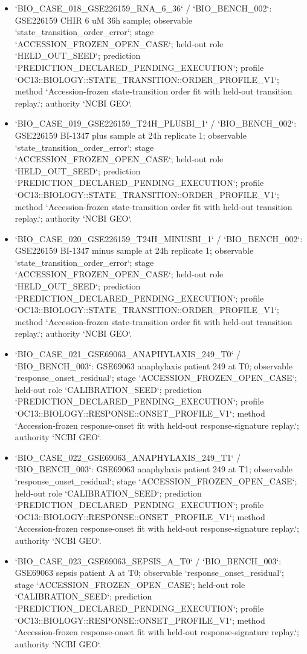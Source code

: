 \begin{itemize}
\item `BIO\_CASE\_018\_GSE226159\_RNA\_6\_36` / `BIO\_BENCH\_002`: GSE226159 CHIR 6 uM 36h sample; observable `state\_transition\_order\_error`; stage `ACCESSION\_FROZEN\_OPEN\_CASE`; held-out role `HELD\_OUT\_SEED`; prediction `PREDICTION\_DECLARED\_PENDING\_EXECUTION`; profile `OC13::BIOLOGY::STATE\_TRANSITION::ORDER\_PROFILE\_V1`; method `Accession-frozen state-transition order fit with held-out transition replay.`; authority `NCBI GEO`.
\item `BIO\_CASE\_019\_GSE226159\_T24H\_PLUSBI\_1` / `BIO\_BENCH\_002`: GSE226159 BI-1347 plus sample at 24h replicate 1; observable `state\_transition\_order\_error`; stage `ACCESSION\_FROZEN\_OPEN\_CASE`; held-out role `HELD\_OUT\_SEED`; prediction `PREDICTION\_DECLARED\_PENDING\_EXECUTION`; profile `OC13::BIOLOGY::STATE\_TRANSITION::ORDER\_PROFILE\_V1`; method `Accession-frozen state-transition order fit with held-out transition replay.`; authority `NCBI GEO`.
\item `BIO\_CASE\_020\_GSE226159\_T24H\_MINUSBI\_1` / `BIO\_BENCH\_002`: GSE226159 BI-1347 minus sample at 24h replicate 1; observable `state\_transition\_order\_error`; stage `ACCESSION\_FROZEN\_OPEN\_CASE`; held-out role `HELD\_OUT\_SEED`; prediction `PREDICTION\_DECLARED\_PENDING\_EXECUTION`; profile `OC13::BIOLOGY::STATE\_TRANSITION::ORDER\_PROFILE\_V1`; method `Accession-frozen state-transition order fit with held-out transition replay.`; authority `NCBI GEO`.
\item `BIO\_CASE\_021\_GSE69063\_ANAPHYLAXIS\_249\_T0` / `BIO\_BENCH\_003`: GSE69063 anaphylaxis patient 249 at T0; observable `response\_onset\_residual`; stage `ACCESSION\_FROZEN\_OPEN\_CASE`; held-out role `CALIBRATION\_SEED`; prediction `PREDICTION\_DECLARED\_PENDING\_EXECUTION`; profile `OC13::BIOLOGY::RESPONSE::ONSET\_PROFILE\_V1`; method `Accession-frozen response-onset fit with held-out response-signature replay.`; authority `NCBI GEO`.
\item `BIO\_CASE\_022\_GSE69063\_ANAPHYLAXIS\_249\_T1` / `BIO\_BENCH\_003`: GSE69063 anaphylaxis patient 249 at T1; observable `response\_onset\_residual`; stage `ACCESSION\_FROZEN\_OPEN\_CASE`; held-out role `CALIBRATION\_SEED`; prediction `PREDICTION\_DECLARED\_PENDING\_EXECUTION`; profile `OC13::BIOLOGY::RESPONSE::ONSET\_PROFILE\_V1`; method `Accession-frozen response-onset fit with held-out response-signature replay.`; authority `NCBI GEO`.
\item `BIO\_CASE\_023\_GSE69063\_SEPSIS\_A\_T0` / `BIO\_BENCH\_003`: GSE69063 sepsis patient A at T0; observable `response\_onset\_residual`; stage `ACCESSION\_FROZEN\_OPEN\_CASE`; held-out role `CALIBRATION\_SEED`; prediction `PREDICTION\_DECLARED\_PENDING\_EXECUTION`; profile `OC13::BIOLOGY::RESPONSE::ONSET\_PROFILE\_V1`; method `Accession-frozen response-onset fit with held-out response-signature replay.`; authority `NCBI GEO`.

\end{itemize}
